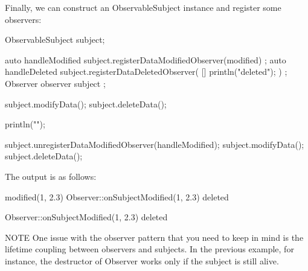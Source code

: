 Finally, we can construct an ObservableSubject instance and register some observers:

\begin{cpp}
ObservableSubject subject;

auto handleModified { subject.registerDataModifiedObserver(modified) };
auto handleDeleted { subject.registerDataDeletedObserver(
    []{ println("deleted"); }) };
Observer observer { subject };

subject.modifyData();
subject.deleteData();

println("");

subject.unregisterDataModifiedObserver(handleModified);
subject.modifyData();
subject.deleteData();
\end{cpp}

The output is as follows:

\begin{shell}
modified(1, 2.3)
Observer::onSubjectModified(1, 2.3)
deleted

Observer::onSubjectModified(1, 2.3)
deleted
\end{shell}

\begin{myNotic}{NOTE}
One issue with the observer pattern that you need to keep in mind is the lifetime coupling between observers and subjects. In the previous example, for instance, the destructor of Observer works only if the subject is still alive.
\end{myNotic}





